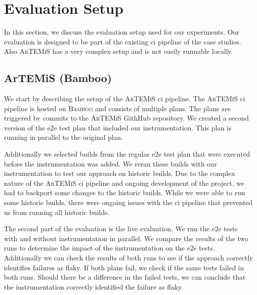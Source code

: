 \section{Evaluation Setup}
In this section, we discuss the evaluation setup used for our experiments.
Our evaluation is designed to be part of the existing \ac{ci} pipeline of the case studies.
Also \textsc{ArTEMiS} has a very complex setup and is not easily runnable locally.

\subsection{ArTEMiS (Bamboo)}
We start by describing the setup of the \textsc{ArTEMiS} \ac{ci} pipeline.
The \textsc{ArTEMiS} \ac{ci} pipeline is hosted on \textsc{Bamboo} \autocite{atlassian_bamboo_nodate} and consists of multiple plans.
The plans are triggered by commits to the \textsc{ArTEMiS} GithHub repository.
We created a second version of the \ac{e2e} test plan that included our instrumentation.
This plan is running in parallel to the original plan.

Additionally we selected builds from the regular \ac{e2e} test plan that were executed before the instrumentation was added.
We reran these builds with our instrumentation to test our approach on historic builds.
Due to the complex nature of the \textsc{ArTEMiS} \ac{ci} pipeline and ongoing development of the project, we had to backport some changes to the historic builds.
While we were able to run some historic builds, there were ongoing issues with the \ac{ci} pipeline that prevented us from running all historic builds.

The second part of the evaluation is the live evaluation.
We run the \ac{e2e} tests with and without instrumentation in parallel.
We compare the results of the two runs to determine the impact of the instrumentation on the \ac{e2e} tests.
Additionally we can check the results of both runs to see if the approach correctly identifies failures as flaky.
If both plans fail, we check if the same tests failed in both runs.
Should there be a difference in the failed tests, we can conclude that the instrumentation correctly identified the failure as flaky.

